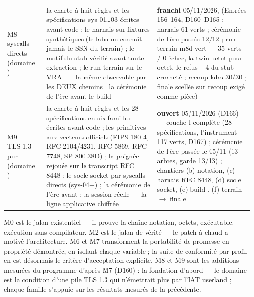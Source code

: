 \begin{table}[htbp]
\begin{tabularx}{\textwidth}{@{}l Y >{\raggedright\arraybackslash}p{2.6cm}@{}}
M8 — syscalls directs (domaine ) & la charte à huit règles et les spécifications sys-01…03 écrites-avant-code ; le harnais sur fixtures  synthétiques (le labo ne connaît jamais le SSN du terrain) ; le motif du stub vérifié avant toute extraction ; le run terrain sur le VRAI  — la même observable par les DEUX chemins ; la cérémonie de l'ère avant le build & \textbf{franchi} 05/11/2026,  (Entrées 156--164, D160--D165 : harnais 61 verts ; cérémonie de l'ère passée 12/12 ; run terrain m8d vert — 35 verts / 0 échec, la twin octet pour octet, le refus $-4$ du stub crocheté ; recoup labo 30/30 ; finale scellée sur recoup exigé comme pièce) \\
M9 — TLS 1.3 pur (domaine ) & la charte à huit règles et les 28 spécifications en six familles écrites-avant-code ; les primitives aux vecteurs officiels (FIPS 180-4, RFC 2104/4231, RFC 5869, RFC 7748, SP 800-38D) ; la poignée rejouée sur le transcript RFC 8448 ; le socle socket par syscalls directs (sys-04+) ; la cérémonie de l'ère avant  ; la session réelle — la ligne applicative chiffrée & \textbf{ouvert} 05/11/2026 (D166) — couche I complète (28 spécifications, l'instrument 117 verts, D167) ; cérémonie de l'ère passée le 05/11 (13 arbres, garde 13/13) ; chantiers (b) notation, (c) harnais RFC 8448, (d) socle socket, (e) build , (f) terrain $\to$ finale  \\
\bottomrule
\end{tabularx}
\end{table}

M0 est le jalon existentiel — il prouve la chaîne notation, octets, exécutable, exécution
sans compilateur. M2 est le jalon de vérité — le patch à chaud a motivé l'architecture.
M6 et M7 transforment la portabilité de promesse en propriété démontrée, en isolant chaque
variable ; la suite de conformité par profil en est désormais le critère d'acceptation
explicite. M8 et M9 sont les additions mesurées du programme d'après M7 (D160) : la
fondation d'abord — le domaine  est la condition d'une pile TLS 1.3 qui
n'émettrait plus par l'IAT userland ; chaque famille s'appuie sur les résultats
mesurés de la précédente.

